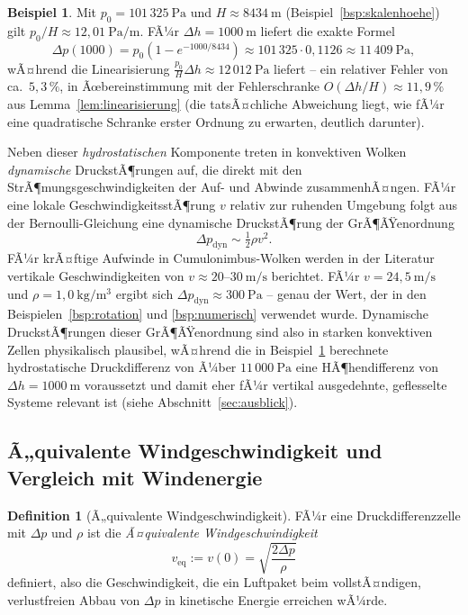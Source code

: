 ﻿\documentclass[a4paper,12pt]{article}
\theoremstyle{definition}
\newtheorem{definition}{Definition}
\newtheorem{beispiel}{Beispiel}
\begin{document}
\begin{beispiel}
	\label{bsp:linearisierung}
	Mit $p_0 = 101\,325\ \mathrm{Pa}$ und $H \approx 8434\ \mathrm{m}$
	(Beispiel~\ref{bsp:skalenhoehe}) gilt $p_0/H \approx 12{,}01\
	\mathrm{Pa/m}$. FÃ¼r $\Delta h = 1000\ \mathrm{m}$ liefert die exakte
	Formel
	\[
		\Delta p(1000) = p_0\left(1 - e^{-1000/8434}\right)
		\approx 101\,325 \cdot 0{,}1126
		\approx 11\,409\ \mathrm{Pa},
	\]
	wÃ¤hrend die Linearisierung $\frac{p_0}{H}\Delta h \approx 12\,012\
	\mathrm{Pa}$ liefert -- ein relativer Fehler von ca.\ $5{,}3\,\%$,
	in Ãœbereinstimmung mit der Fehlerschranke $O(\Delta h/H) \approx
	11{,}9\,\%$ aus Lemma~\ref{lem:linearisierung} (die tatsÃ¤chliche
	Abweichung liegt, wie fÃ¼r eine quadratische Schranke erster Ordnung
	zu erwarten, deutlich darunter).
\end{beispiel}

Neben dieser \emph{hydrostatischen} Komponente treten in konvektiven
Wolken \emph{dynamische} DruckstÃ¶rungen auf, die direkt mit den
StrÃ¶mungsgeschwindigkeiten der Auf- und Abwinde zusammenhÃ¤ngen. FÃ¼r eine
lokale GeschwindigkeitsstÃ¶rung $v$ relativ zur ruhenden Umgebung folgt aus
der Bernoulli-Gleichung eine dynamische DruckstÃ¶rung der GrÃ¶ÃŸenordnung
\[
	\Delta p_{\mathrm{dyn}} \sim \tfrac{1}{2}\rho v^2.
\]
FÃ¼r krÃ¤ftige Aufwinde in Cumulonimbus-Wolken werden in der Literatur
vertikale Geschwindigkeiten von $v \approx 20$--$30\ \mathrm{m/s}$
berichtet. FÃ¼r $v = 24{,}5\ \mathrm{m/s}$ und $\rho = 1{,}0\
\mathrm{kg/m^3}$ ergibt sich $\Delta p_{\mathrm{dyn}} \approx
300\ \mathrm{Pa}$ -- genau der Wert, der in den
Beispielen~\ref{bsp:rotation} und \ref{bsp:numerisch} verwendet wurde.
Dynamische DruckstÃ¶rungen dieser GrÃ¶ÃŸenordnung sind also in starken
konvektiven Zellen physikalisch plausibel, wÃ¤hrend die in
Beispiel~\ref{bsp:linearisierung} berechnete hydrostatische
Druckdifferenz von Ã¼ber $11\,000\ \mathrm{Pa}$ eine HÃ¶hendifferenz von
$\Delta h = 1000\ \mathrm{m}$ voraussetzt und damit eher fÃ¼r vertikal
ausgedehnte, geflesselte Systeme relevant ist (siehe
Abschnitt~\ref{sec:ausblick}).

\subsection{Ã„quivalente Windgeschwindigkeit und Vergleich mit Windenergie}

\begin{definition}[Ã„quivalente Windgeschwindigkeit]
	FÃ¼r eine Druckdifferenzzelle mit $\Delta p$ und $\rho$ ist die
	\emph{Ã¤quivalente Windgeschwindigkeit}
	\[
		v_{\mathrm{eq}} := v(0) = \sqrt{\frac{2\Delta p}{\rho}}
	\]
	definiert, also die Geschwindigkeit, die ein Luftpaket beim
	vollstÃ¤ndigen, verlustfreien Abbau von $\Delta p$ in kinetische
	Energie erreichen wÃ¼rde.
\end{definition}
\end{document}
